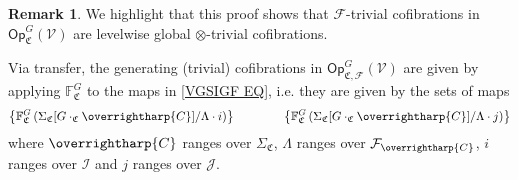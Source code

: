 \documentclass[a4paper,10pt
,draft
]{article}%
\numberwithin{equation}{section}
\numberwithin{figure}{section}
\theoremstyle{definition} %
\newtheorem{remark}[equation]{Remark}%
\newcommand{\vect}[1]{\text{\overrightharp{\ensuremath{#1}}}}
\newcommand{\Op}{\mathsf{Op}}%
\newcommand{\F}{\ensuremath{\mathcal F}}
\newcommand{\V}{\ensuremath{\mathcal V}}
\newcommand{\1}{\ensuremath{\mathbbm 1}}%
\begin{document}
\begin{remark}
      \label{GOTC_REM}
      We highlight that this proof shows that $\F$-trivial cofibrations in $\Op^G_{\mathfrak C}(\V)$ are levelwise global $\otimes$-trivial cofibrations.
\end{remark}

Via transfer, the generating (trivial) cofibrations in
$\mathsf{Op}^G_{\mathfrak{C},\F}(\V)$
are given by applying $\mathbb{F}^G_{\mathfrak{C}}$
to the maps in \eqref{VGSIGF EQ}, i.e. they are given by the sets of maps
\begin{equation}\label{FVGSIGF EQ}
	\left\{
	\mathbb{F}^G_{\mathfrak{C}}
	\left(\Sigma_{\mathfrak{C}}[G \cdot_{\mathfrak{C}} \vect{C}]/\Lambda \cdot i \right)
	\right\}
\qquad \qquad
	\left\{
	\mathbb{F}^G_{\mathfrak{C}}
	\left(\Sigma_{\mathfrak{C}}[G \cdot_{\mathfrak{C}} \vect{C}]/\Lambda \cdot j \right)
	\right\}
\end{equation}
where $\vect{C}$ ranges over $\Sigma_{\mathfrak{C}}$,
$\Lambda$ ranges over $\F_{\vect{C}}$,
$i$ ranges over $\mathcal{I}$ and
$j$ ranges over $\mathcal{J}$.
\end{document}
